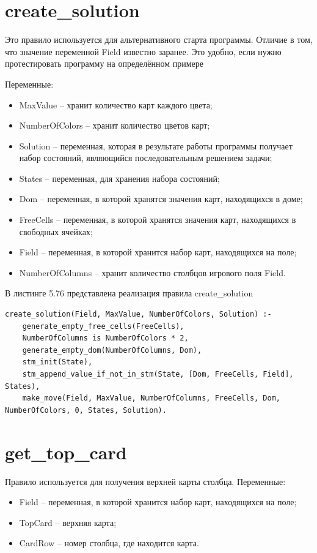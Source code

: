 \documentclass[12pt]{report}
\begin{document}
\section{create\_solution}
Это правило используется для альтернативного старта программы. Отличие в том, что значение переменной Field известно заранее. Это удобно, если нужно протестировать программу на определённом примере

Переменные:
\begin{itemize}
\item MaxValue – хранит количество карт каждого цвета;
\item NumberOfColors – хранит количество цветов карт;
\item Solution – переменная, которая в результате работы программы получает набор состояний, являющийся последовательным решением задачи;
\item States – переменная, для хранения набора состояний;
\item Dom – переменная, в которой хранятся значения карт, находящихся в доме;
\item FreeCells – переменная, в которой хранятся значения карт, находящихся в свободных ячейках;
\item Field – переменная, в которой хранится набор карт, находящихся на поле;
\item NumberOfColumns – хранит количество столбцов игрового поля Field.
\end{itemize}

В листинге 5.76 представлена реализация правила create\_solution

\begin{lstlisting}[label=some-code, caption=реализация правила create\_solution] 
create_solution(Field, MaxValue, NumberOfColors, Solution) :-
	generate_empty_free_cells(FreeCells),
	NumberOfColumns is NumberOfColors * 2,
	generate_empty_dom(NumberOfColumns, Dom),
	stm_init(State),
	stm_append_value_if_not_in_stm(State, [Dom, FreeCells, Field], States),
	make_move(Field, MaxValue, NumberOfColumns, FreeCells, Dom, NumberOfColors, 0, States, Solution).

\end{lstlisting}
\section{get\_top\_card}
Правило используется для получения верхней карты столбца.
Переменные:
\begin{itemize}
\item Field – переменная, в которой хранится набор карт, находящихся на поле;
\item TopCard – верхняя карта;
\item CardRow – номер столбца, где находится карта.
\end{itemize}
\end{document}
